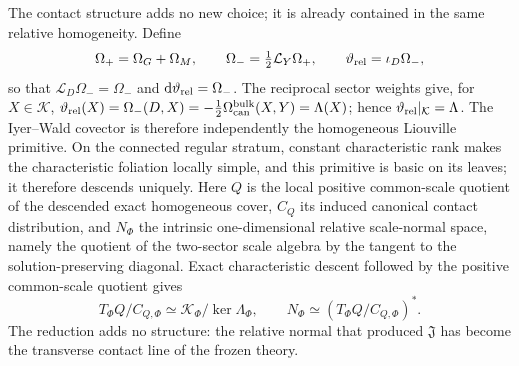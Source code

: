 \documentclass[aps,prl,reprint]{revtex4-2}
\newcommand{\dd}{\mathrm d}
\newcommand{\Lie}{\mathcal L}
\newcommand{\cK}{\mathcal K}
\begin{document}
The contact structure adds no new choice; it is already contained in the same relative homogeneity. Define
\begin{equation}
\Omega_+=\Omega_G+\Omega_M,
\qquad
\Omega_-=\tfrac12\Lie_Y\Omega_+,
\qquad
\vartheta_{\rm rel}=\iota_D\Omega_-,
\label{eq:omega}
\end{equation}
so that $\Lie_D\Omega_-=\Omega_-$ and
$\dd\vartheta_{\rm rel}=\Omega_-$. The reciprocal sector weights give, for $X\in\cK$,
$\vartheta_{\rm rel}(X)=\Omega_-(D,X)=-\tfrac12\Omega_{\rm can}^{\rm bulk}(X,Y)=\Lambda(X)$; hence $\vartheta_{\rm rel}|_{\cK}=\Lambda$. The Iyer--Wald covector is therefore independently the homogeneous Liouville primitive. On the connected regular stratum, constant characteristic rank makes the characteristic foliation locally simple, and this primitive is basic on its leaves; it therefore descends uniquely. Here $Q$ is the local positive common-scale quotient of the descended exact homogeneous cover, $C_Q$ its induced canonical contact distribution, and $N_\Phi$ the intrinsic one-dimensional relative scale-normal space, namely the quotient of the two-sector scale algebra by the tangent to the solution-preserving diagonal. Exact characteristic descent followed by the positive common-scale quotient gives
\begin{equation}
T_\Phi Q/C_{Q,\Phi}
\simeq\cK_\Phi/\ker\Lambda_\Phi,
\qquad
N_\Phi\simeq(T_\Phi Q/C_{Q,\Phi})^* .
\label{eq:contact}
\end{equation}
The reduction adds no structure: the relative normal that produced $\mathfrak J$ has become the transverse contact line of the frozen theory.
\end{document}
